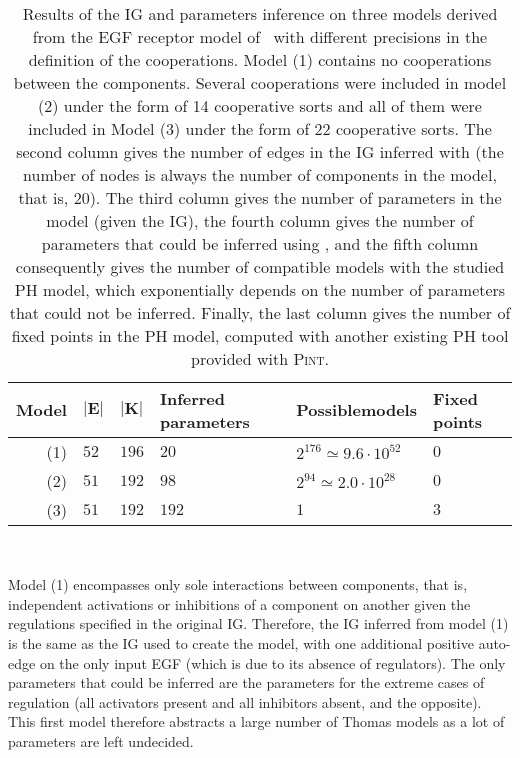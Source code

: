 \begin{table}[ht]
~\hfill%
  \begin{tabular}{r|l|l|m{2cm}|m{2.5cm}|m{1.5cm}}
    \textbf{Model} & $\mathbf{|E|}$ & $\mathbf{|K|}$ & \textbf{Inferred parameters} & \textbf{Possible\newline models} & \textbf{Fixed points}
  \\\hline\hline
    (1) & $52$ & $196$ & $20$ & $2^{176}\simeq 9.6\cdot10^{52}$ & $0$   %
  \\\hline
    (2) & $51$ & $192$ & $98$ & $2^{94}\simeq 2.0\cdot10^{28}$ & $0$    %
  \\\hline
    (3) & $51$ & $192$ & $192$ & $1$ & $3$                              %
  \\\hline
  \end{tabular}
\hfill~%
  \caption{%
  Results of the IG and parameters inference on three models
  derived from the EGF receptor model of~\cite{Sahin09}
  with different precisions in the definition of the cooperations.
  Model (1) contains no cooperations between the components.
  Several cooperations were included in model (2) under the form of 14 cooperative sorts
  and all of them were included in Model (3) under the form of 22 cooperative sorts.
  The second column gives the number of edges in the IG inferred with 
  (the number of nodes is always the number of components in the model, that is, 20).
  The third column gives the number of parameters in the model (given the IG),
  the fourth column gives the number of parameters that could be inferred using ,
  and the fifth column consequently gives the number of compatible models with the studied PH model,
  which exponentially depends on the number of parameters that could not be inferred.
  Finally, the last column gives the number of fixed points in the PH model,
  computed with another existing PH tool provided with \textsc{Pint}.
  }
  \label{tb:egfr20}
\end{table}

Model (1) encompasses only sole interactions between components, that is,
independent activations or inhibitions of a component on another given the regulations specified in the original IG.
Therefore, the IG inferred from model (1) is the same as the IG used to create the model,
with one additional positive auto-edge on the only input EGF (which is due to its absence of regulators).
The only parameters that could be inferred are the parameters for the extreme cases of regulation
(all activators present and all inhibitors absent, and the opposite).
This first model therefore abstracts a large number of Thomas models as a lot of parameters are left undecided.

